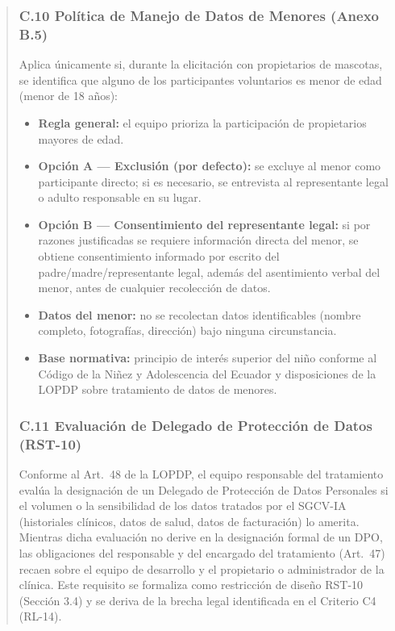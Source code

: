 \documentclass[
]{article}
\begin{document}
\begin{quote}
\subsubsection{C.10 Política de Manejo de Datos de Menores (Anexo B.5)}\label{c10-datos-menores}

Aplica únicamente si, durante la elicitación con propietarios de mascotas, se identifica que alguno de los participantes voluntarios es menor de edad (menor de 18 años):

\begin{itemize}
  \item \textbf{Regla general:} el equipo prioriza la participación de propietarios mayores de edad.
  \item \textbf{Opción A --- Exclusión (por defecto):} se excluye al menor como participante directo; si es necesario, se entrevista al representante legal o adulto responsable en su lugar.
  \item \textbf{Opción B --- Consentimiento del representante legal:} si por razones justificadas se requiere información directa del menor, se obtiene consentimiento informado por escrito del padre/madre/representante legal, además del asentimiento verbal del menor, antes de cualquier recolección de datos.
  \item \textbf{Datos del menor:} no se recolectan datos identificables (nombre completo, fotografías, dirección) bajo ninguna circunstancia.
  \item \textbf{Base normativa:} principio de interés superior del niño conforme al Código de la Niñez y Adolescencia del Ecuador y disposiciones de la LOPDP sobre tratamiento de datos de menores.
\end{itemize}

\subsubsection{C.11 Evaluación de Delegado de Protección de Datos
(RST-10)}\label{c11-delegado-proteccion-datos}

Conforme al Art.\ 48 de la LOPDP, el equipo responsable del tratamiento
evalúa la designación de un Delegado de Protección de Datos Personales
si el volumen o la sensibilidad de los datos tratados por el SGCV-IA
(historiales clínicos, datos de salud, datos de facturación) lo
amerita. Mientras dicha evaluación no derive en la designación formal
de un DPO, las obligaciones del responsable y del encargado del
tratamiento (Art.\ 47) recaen sobre el equipo de desarrollo y el
propietario o administrador de la clínica. Este requisito se formaliza
como restricción de diseño RST-10 (Sección 3.4) y se deriva de la
brecha legal identificada en el Criterio C4 (RL-14).


\end{quote}
\end{document}
